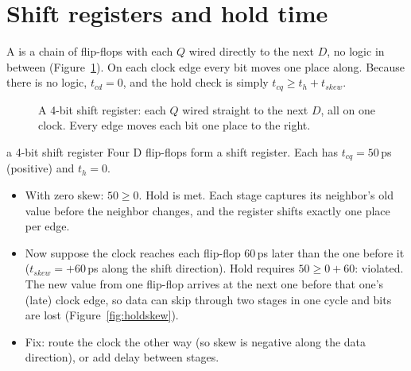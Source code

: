 \section{Shift registers and hold time}

A  is a chain of flip-flops with each $Q$ wired directly to the next $D$, no logic in between (Figure~\ref{fig:shiftreg}). On each clock edge every bit moves one place along. Because there is no logic, $t_{cd} = 0$, and the hold check is simply $t_{cq} \ge t_h + t_{skew}$.

\begin{figure}[h]
\centering
{}
\caption{A 4-bit shift register: each $Q$ wired straight to the next $D$, all on one clock. Every edge moves each bit one place to the right.}
\label{fig:shiftreg}
\end{figure}

\begin{worked}{a 4-bit shift register}
Four D flip-flops form a shift register. Each has $t_{cq} = 50$\,ps (positive) and $t_h = 0$.
\begin{itemize}
  \item With zero skew: $50 \ge 0$. Hold is met. Each stage captures its neighbor's old value before the neighbor changes, and the register shifts exactly one place per edge.
  \item Now suppose the clock reaches each flip-flop 60\,ps later than the one before it ($t_{skew} = +60$\,ps along the shift direction). Hold requires $50 \ge 0 + 60$: violated. The new value from one flip-flop arrives at the next one before that one's (late) clock edge, so data can skip through two stages in one cycle and bits are lost (Figure~\ref{fig:holdskew}).
  \item Fix: route the clock the other way (so skew is negative along the data direction), or add delay between stages.
\end{itemize}
\end{worked}

